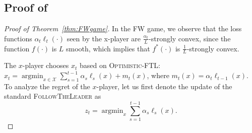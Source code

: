 \documentclass[final,12pt]{colt2018} %
\def\argmin{\mathop{\arg\min}}
\def\FTL{\textsc{FollowTheLeader}\xspace}
\def\OFTL{\textsc{Optimistic-FTL}\xspace}
\newcommand{\XX}{\mathcal{X}}
\begin{document}
\subsection{Proof of }
\begin{proof}[Proof of Theorem~\ref{thm:FWgame}]
	In the FW game,
	we observe that the loss functions $\alpha_{t} \ell_{t}(\cdot)$ seen by the x-player are $\frac{\alpha_t}{L}$-strongly convex,
	since the function $f(\cdot)$ is $L$ smooth, which implies that $f^{*}(\cdot)$ is $\frac{1}{L}$-strongly convex.
	
	The $x$-player chooses $x_{t}$ based on \OFTL:
	$x_t = \argmin_{x \in \XX} \sum_{s=1}^{t-1} \alpha_s \ell_s(x) + m_{t}(x)$,
	where $m_{t}(x) = \alpha_{t} \ell_{{t-1}}(x)$.
	To analyze the regret of the $x$-player, let us first denote 
	the update of the standard \FTL as
	\begin{equation}
\textstyle	z_t = \argmin_{x} \sum_{s=1}^{t-1} \alpha_s \ell_s(x).
	\end{equation}
	

\end{proof}
\end{document}
